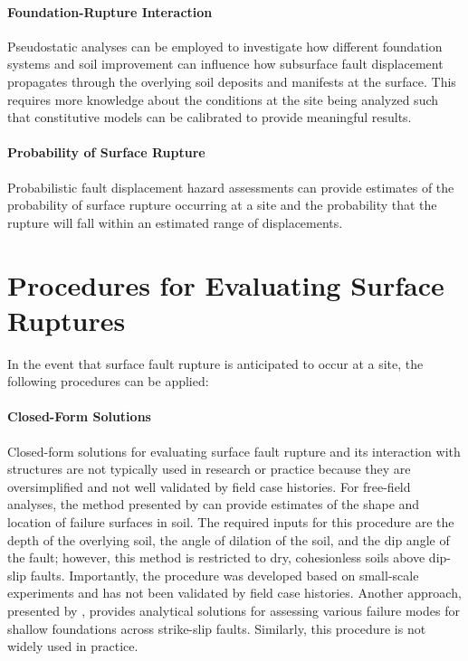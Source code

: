 \paragraph{Foundation-Rupture Interaction}
Pseudostatic analyses can be employed to investigate how different foundation systems and soil improvement can influence how subsurface fault displacement propagates through the overlying soil deposits and manifests at the surface. This requires more knowledge about the conditions at the site being analyzed such that constitutive models can be calibrated to provide meaningful results.

\paragraph{Probability of Surface Rupture}
Probabilistic fault displacement hazard assessments can provide estimates of the probability of surface rupture occurring at a site and the probability that the rupture will fall within an estimated range of displacements.

\section{Procedures for Evaluating Surface Ruptures}
\label{sec:eq_surface_rup_procedures}

In the event that surface fault rupture is anticipated to occur at a site, the following procedures can be applied:

\paragraph{Closed-Form Solutions}
Closed-form solutions for evaluating surface fault rupture and its interaction with structures are not typically used in research or practice because they are oversimplified and not well validated by field case histories. For free-field analyses, the method presented by \cite{cole1984influence} can provide estimates of the shape and location of failure surfaces in soil. The required inputs for this procedure are the depth of the overlying soil, the angle of dilation of the soil, and the dip angle of the fault; however, this method is restricted to dry, cohesionless soils above dip-slip faults.  Importantly, the procedure was developed based on small-scale experiments and has not been validated by field case histories. Another approach, presented by \cite{berrill1983twodimensional}, provides analytical solutions for assessing various failure modes for shallow foundations across strike-slip faults. Similarly, this procedure is not widely used in practice.

